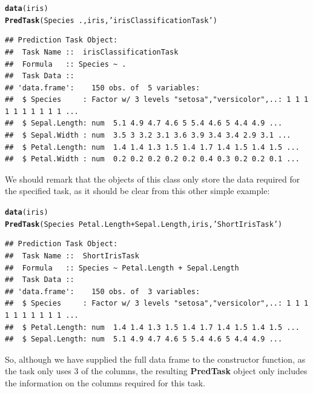 \documentclass[10pt,a4paper]{article}\usepackage[]{graphicx}\usepackage[]{color}
\makeatletter
\newcommand{\hlstr}[1]{\textcolor[rgb]{0.192,0.494,0.8}{#1}}%
\newcommand{\hlopt}[1]{\textcolor[rgb]{0,0,0}{#1}}%
\newcommand{\hlstd}[1]{\textcolor[rgb]{0.345,0.345,0.345}{#1}}%
\newcommand{\hlkwd}[1]{\textcolor[rgb]{0.737,0.353,0.396}{\textbf{#1}}}%
\newenvironment{kframe}{%
 \def\at@end@of@kframe{}%
 \ifinner\ifhmode%
  \def\at@end@of@kframe{\end{minipage}}%
  \begin{minipage}{\columnwidth}%
 \fi\fi%
 \def\FrameCommand##1{\hskip\@totalleftmargin \hskip-\fboxsep
 \colorbox{shadecolor}{##1}\hskip-\fboxsep
     \hskip-\linewidth \hskip-\@totalleftmargin \hskip\columnwidth}%
 \MakeFramed {\advance\hsize-\width
   \@totalleftmargin\z@ \linewidth\hsize
   \@setminipage}}%
 {\par\unskip\endMakeFramed%
 \at@end@of@kframe}
\newenvironment{knitrout}{}{} %
\makeatother
\begin{document}
\begin{knitrout}\footnotesize
{}\color{fgcolor}\begin{kframe}
\begin{alltt}
\hlkwd{data}\hlstd{(iris)}
\hlkwd{PredTask}\hlstd{(Species} \hlopt{~} \hlstd{.,iris,}\hlstr{'irisClassificationTask'}\hlstd{)}
\end{alltt}
\begin{verbatim}
## Prediction Task Object:
## 	Task Name ::  irisClassificationTask
## 	Formula   :: Species ~ .
## 	Task Data ::
## 'data.frame':	150 obs. of  5 variables:
##  $ Species     : Factor w/ 3 levels "setosa","versicolor",..: 1 1 1 1 1 1 1 1 1 1 ...
##  $ Sepal.Length: num  5.1 4.9 4.7 4.6 5 5.4 4.6 5 4.4 4.9 ...
##  $ Sepal.Width : num  3.5 3 3.2 3.1 3.6 3.9 3.4 3.4 2.9 3.1 ...
##  $ Petal.Length: num  1.4 1.4 1.3 1.5 1.4 1.7 1.4 1.5 1.4 1.5 ...
##  $ Petal.Width : num  0.2 0.2 0.2 0.2 0.2 0.4 0.3 0.2 0.2 0.1 ...
\end{verbatim}
\end{kframe}
\end{knitrout}


We should remark that the objects of this class only store the data
required for the specified task, as it should be clear from this other
simple example:

\begin{knitrout}\footnotesize
{}\color{fgcolor}\begin{kframe}
\begin{alltt}
\hlkwd{data}\hlstd{(iris)}
\hlkwd{PredTask}\hlstd{(Species} \hlopt{~} \hlstd{Petal.Length} \hlopt{+} \hlstd{Sepal.Length,iris,}\hlstr{'ShortIrisTask'}\hlstd{)}
\end{alltt}
\begin{verbatim}
## Prediction Task Object:
## 	Task Name ::  ShortIrisTask
## 	Formula   :: Species ~ Petal.Length + Sepal.Length
## 	Task Data ::
## 'data.frame':	150 obs. of  3 variables:
##  $ Species     : Factor w/ 3 levels "setosa","versicolor",..: 1 1 1 1 1 1 1 1 1 1 ...
##  $ Petal.Length: num  1.4 1.4 1.3 1.5 1.4 1.7 1.4 1.5 1.4 1.5 ...
##  $ Sepal.Length: num  5.1 4.9 4.7 4.6 5 5.4 4.6 5 4.4 4.9 ...
\end{verbatim}
\end{kframe}
\end{knitrout}


So, although we have supplied the full data frame to the constructor
function, as the task only uses 3 of the columns, the resulting
\textbf{PredTask} object only includes the information on the columns
required for this task.
\end{document}
